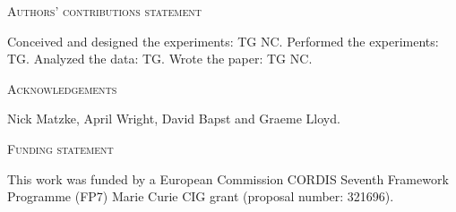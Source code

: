 \documentclass[12pt,letterpaper]{article}
\renewcommand{\section}[1]{%
\bigskip
\begin{center}
\begin{Large}
\normalfont\scshape #1
\medskip
\end{Large}
\end{center}}
\begin{document}
\section{Authors’ contributions statement}
Conceived and designed the experiments: TG NC. Performed the experiments: TG. Analyzed the data: TG. Wrote the paper: TG NC.
\section{Acknowledgements}
Nick Matzke, April Wright, David Bapst and Graeme Lloyd. %
\section{Funding statement}
This work was funded by a European Commission CORDIS Seventh Framework Programme (FP7) Marie Curie CIG grant (proposal number: 321696).





\newcommand{\beginsupplement}{%
    \setcounter{table}{0}
    \renewcommand{\thetable}{S\arabic{table}}%
    \setcounter{figure}{0}
    \renewcommand{\thefigure}{S\arabic{figure}}%
}
\beginsupplement



\end{document}
